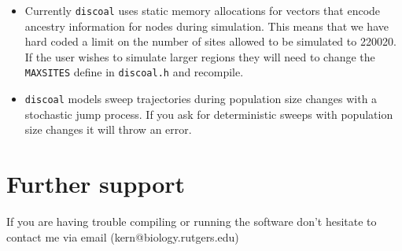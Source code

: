 \documentclass[12pt]{article}
\begin{document}
\begin{itemize}

	\item Currently \texttt{discoal} uses static memory allocations for vectors that encode ancestry information for nodes during simulation. This means that we have hard coded a limit on the number of sites allowed to be simulated to 220020. If the user wishes to simulate larger regions they will need to change the \texttt{MAXSITES} define in \texttt{discoal.h} and recompile. 


	\item \texttt{discoal} models sweep trajectories during population size changes with a stochastic jump process. If you ask for deterministic sweeps with population size changes it will throw an error.

\end{itemize}


\section*{Further support}
If you are having trouble compiling or running the software don't hesitate to contact me via email (kern@biology.rutgers.edu)



\end{document}
